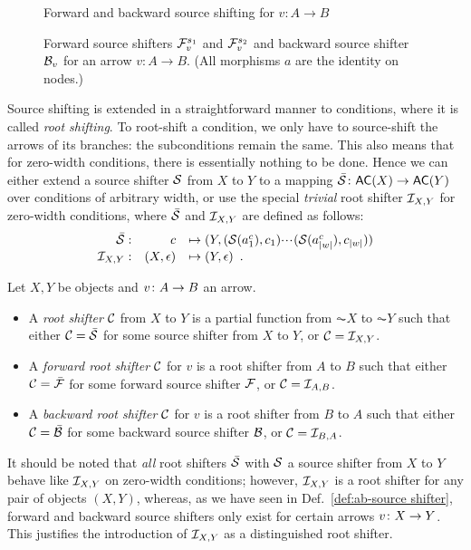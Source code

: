 \begin{figure}[t]
\centering

\caption{Forward and backward source shifting for $v:A\to B$}
\end{figure}

\begin{figure}
\centering

\caption{Forward source shifters $\mathcal{F}_v^{s_1}$ and $\mathcal{F}_v^{s_2}$ and backward source shifter $\mathcal{B}_v$ for an arrow $v:A\to B$. (All morphisms $a$ are the identity on nodes.)}
\end{figure}

Source shifting is extended in a straightforward manner to conditions, where it is called \emph{root shifting}. To root-shift a condition, we only have to source-shift the arrows of its branches: the subconditions remain the same. This also means that for zero-width conditions, there is essentially nothing to be done. Hence we can either extend a source shifter $\mathcal{S}$ from $X$ to $Y$ to a mapping $\bar\cS\of \AC X\to \AC Y$ over conditions of arbitrary width, or use the special \emph{trivial} root shifter $\mathcal{I}_{X,Y}$ for zero-width conditions, where $\bar{\mathcal{S}}$ and $\mathcal{I}_{X,Y}$ are defined as follows:
\[\begin{array}{rrl}
\bar{\mathcal{S}}: & c & \mapsto (Y,(\mathcal{S}(a^c_1),c_1){\cdotp\mkern-2mu\cdotp\mkern-2mu\cdotp\mkern1mu} (\mathcal{S}(a^c_{|w|}),c_{|w|})) \\
\mathcal{I}_{X,Y}: & (X,\epsilon) & \mapsto (Y,\epsilon) \enspace.
\end{array}\]

\begin{definition}\label{def:ab-root shifter}
Let $X,Y$ be objects and $v\colon A\rightarrow B$ an arrow.
\begin{itemize}[topsep=\smallskipamount]
\item A \emph{root shifter} $\mathcal{C}$ from $X$ to $Y$ is a partial function from $\AC X$ to $\AC Y$ such that either $\mathcal{C}=\bar{\mathcal{S}}$ for some source shifter from $X$ to $Y$, or $\mathcal{C}=\mathcal{I}_{X,Y}$.

\item A \emph{forward root shifter} $\mathcal{C}$ for $v$ is a root shifter from $A$ to $B$ such that either $\mathcal{C}=\bar{\mathcal{F}}$ for some forward source shifter $\mathcal{F}$, or $\mathcal{C}=\mathcal{I}_{A,B}$.

\item A \emph{backward root shifter} $\mathcal{C}$ for $v$ is a root shifter from $B$ to $A$ such that either $\mathcal{C}=\bar{\mathcal{B}}$ for some backward source shifter $\mathcal{B}$, or $\mathcal{C}=\mathcal{I}_{B,A}$.
\end{itemize}
\end{definition}
%
It should be noted that \emph{all} root shifters $\bar{\mathcal{S}}$ with $\mathcal{S}$ a source shifter from $X$ to $Y$ behave like $\mathcal{I}_{X,Y}$ on zero-width conditions; however, $\mathcal{I}_{X,Y}$ is a root shifter for any pair of objects $(X,Y)$, whereas, as we have seen in Def.~\ref{def:ab-source shifter}, forward and backward source shifters only exist for certain arrows $v\colon X \rightarrow Y$. This justifies the introduction of $\mathcal{I}_{X,Y}$ as a  distinguished root shifter.

